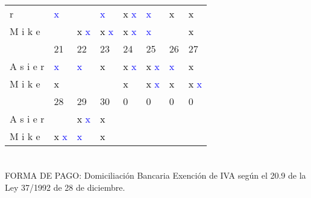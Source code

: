 \documentclass{article}%
\begin{document}
\begin{longtabu}{| X[l] | X[c] | X[c] | X[c] | X[c] | X[c] | X[c] | X[c] |}
r&\textcolor{black}{%
}%
\textcolor{blue}{%
x%
}&\textcolor{black}{%
}%
\textcolor{blue}{%
}&\textcolor{black}{%
}%
\textcolor{blue}{%
x%
}&\textcolor{black}{%
x%
}%
\textcolor{blue}{%
x%
}&\textcolor{black}{%
}%
\textcolor{blue}{%
x%
}&\textcolor{black}{%
x%
}%
\textcolor{blue}{%
}&\textcolor{black}{%
x%
}%
\textcolor{blue}{%
}\\%
M%
i%
k%
e&\textcolor{black}{%
}%
\textcolor{blue}{%
}&\textcolor{black}{%
x%
}%
\textcolor{blue}{%
x%
}&\textcolor{black}{%
x%
}%
\textcolor{blue}{%
x%
}&\textcolor{black}{%
x%
}%
\textcolor{blue}{%
x%
}&\textcolor{black}{%
}%
\textcolor{blue}{%
x%
}&\textcolor{black}{%
}%
\textcolor{blue}{%
}&\textcolor{black}{%
x%
}%
\textcolor{blue}{%
}\\%
\hline%
\hline%
&21&22&23&24&25&26&27\\%
\hline%
A%
s%
i%
e%
r&\textcolor{black}{%
}%
\textcolor{blue}{%
x%
}&\textcolor{black}{%
}%
\textcolor{blue}{%
x%
}&\textcolor{black}{%
x%
}%
\textcolor{blue}{%
}&\textcolor{black}{%
x%
}%
\textcolor{blue}{%
x%
}&\textcolor{black}{%
x%
}%
\textcolor{blue}{%
x%
}&\textcolor{black}{%
}%
\textcolor{blue}{%
x%
}&\textcolor{black}{%
x%
}%
\textcolor{blue}{%
}\\%
M%
i%
k%
e&\textcolor{black}{%
x%
}%
\textcolor{blue}{%
}&\textcolor{black}{%
}%
\textcolor{blue}{%
}&\textcolor{black}{%
}%
\textcolor{blue}{%
}&\textcolor{black}{%
x%
}%
\textcolor{blue}{%
}&\textcolor{black}{%
x%
}%
\textcolor{blue}{%
x%
}&\textcolor{black}{%
x%
}%
\textcolor{blue}{%
}&\textcolor{black}{%
x%
}%
\textcolor{blue}{%
x%
}\\%
\hline%
\hline%
&28&29&30&0&0&0&0\\%
\hline%
A%
s%
i%
e%
r&\textcolor{black}{%
}%
\textcolor{blue}{%
}&\textcolor{black}{%
x%
}%
\textcolor{blue}{%
x%
}&\textcolor{black}{%
x%
}%
\textcolor{blue}{%
}&&&&\\%
M%
i%
k%
e&\textcolor{black}{%
x%
}%
\textcolor{blue}{%
x%
}&\textcolor{black}{%
}%
\textcolor{blue}{%
x%
}&\textcolor{black}{%
x%
}%
\textcolor{blue}{%
}&&&&\\%
\hline%
\hline%
%
\end{longtabu}%
\vspace*{10ex}
\section*{}%
\label{sec:}%
FORMA DE PAGO: Domiciliación Bancaria\newline%
%
Exención de IVA según el 20.9 de la Ley 37/1992 de 28 de diciembre.

%
\pagestyle{firstpage}%
\end{document}
